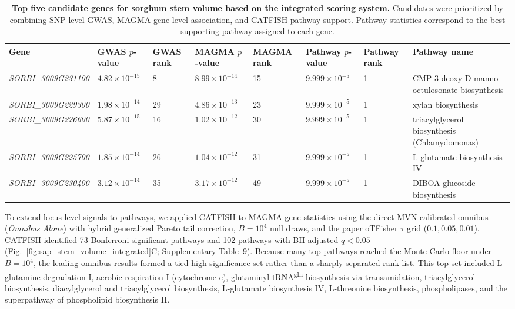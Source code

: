 \documentclass[unnumsec,webpdf,contemporary,large]{oup-authoring-template}%
\theoremstyle{thmstyleone}%
\theoremstyle{thmstyletwo}%
\theoremstyle{thmstylethree}%
\begin{document}
\begin{table}[htbp]
\centering
\caption{\textbf{Top five candidate genes for sorghum stem volume based on the integrated scoring system.} Candidates were prioritized by combining SNP-level GWAS, MAGMA gene-level association, and CATFISH pathway support. Pathway statistics correspond to the best supporting pathway assigned to each gene.}
\label{tab:sap_stem_volume_top5_candidates}
\small
\begin{tabular}{llllllll}
\hline
Gene & GWAS $p$-value & GWAS rank & MAGMA $p$-value & MAGMA rank & Pathway $p$-value & Pathway rank & Pathway name \\
\hline
\textit{SORBI\_3009G231100} & $4.82 \times 10^{-15}$ & 8  & $8.99 \times 10^{-14}$ & 15 & $9.999 \times 10^{-5}$ & 1 & CMP-3-deoxy-D-manno-octulosonate biosynthesis \\
\textit{SORBI\_3009G229300} & $1.98 \times 10^{-14}$ & 29 & $4.86 \times 10^{-13}$ & 23 & $9.999 \times 10^{-5}$ & 1 & xylan biosynthesis \\
\textit{SORBI\_3009G226600} & $5.87 \times 10^{-15}$ & 16 & $1.02 \times 10^{-12}$ & 30 & $9.999 \times 10^{-5}$ & 1 & triacylglycerol biosynthesis (Chlamydomonas) \\
\textit{SORBI\_3009G225700} & $1.85 \times 10^{-14}$ & 26 & $1.04 \times 10^{-12}$ & 31 & $9.999 \times 10^{-5}$ & 1 & L-glutamate biosynthesis IV \\
\textit{SORBI\_3009G230400} & $3.12 \times 10^{-14}$ & 35 & $3.17 \times 10^{-12}$ & 49 & $9.999 \times 10^{-5}$ & 1 & DIBOA-glucoside biosynthesis \\
\hline
\end{tabular}
\end{table}

To extend locus-level signals to pathways, we applied CATFISH to MAGMA gene statistics using the direct MVN-calibrated omnibus (\emph{Omnibus Alone}) with hybrid generalized Pareto tail correction, \(B = 10^{4}\) null draws, and the paper oTFisher \(\tau\) grid (\(0.1, 0.05, 0.01\)). CATFISH identified 73 Bonferroni-significant pathways and 102 pathways with BH-adjusted \(q < 0.05\) (Fig.~\ref{fig:sap_stem_volume_integrated}C; Supplementary Table~9). Because many top pathways reached the Monte Carlo floor under \(B = 10^{4}\), the leading omnibus results formed a tied high-significance set rather than a sharply separated rank list. This top set included L-glutamine degradation I, aerobic respiration I (cytochrome c), glutaminyl-tRNA\textsuperscript{gln} biosynthesis via transamidation, triacylglycerol biosynthesis, diacylglycerol and triacylglycerol biosynthesis, L-glutamate biosynthesis IV, L-threonine biosynthesis, phospholipases, and the superpathway of phospholipid biosynthesis II.
\end{document}
